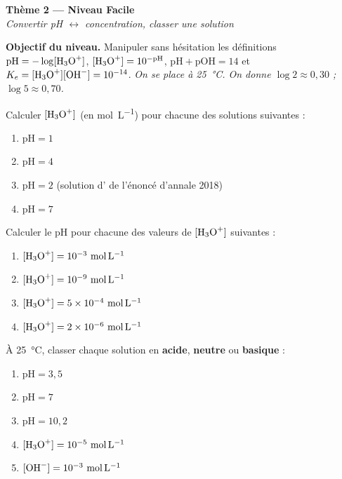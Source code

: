 \documentclass[11pt,a4paper]{article}
\begin{document}
\begin{center}
{\LARGE\bfseries\color{primarydark} Thème 2 --- Niveau Facile}\\[2pt]
{\color{primary}\itshape Convertir pH $\leftrightarrow$ concentration, classer une solution}
\end{center}

\begin{consigne}
\textbf{Objectif du niveau.} Manipuler sans hésitation les définitions $\mathrm{pH}=-\log[\ce{H3O+}]$,
$[\ce{H3O+}]=10^{-\mathrm{pH}}$, $\mathrm{pH}+\mathrm{pOH}=14$ et $K_e=[\ce{H3O+}][\ce{OH-}]=10^{-14}$.
\emph{On se place à \SI{25}{\celsius}. On donne $\log 2 \approx 0{,}30$ ; $\log 5 \approx 0{,}70$.}
\end{consigne}

\begin{exobox}
Calculer $[\ce{H3O+}]$ (en \si{mol.L^{-1}}) pour chacune des solutions suivantes :
\begin{enumerate}[label=\alph*),leftmargin=1.6em,itemsep=1pt]
  \item $\mathrm{pH} = 1$
  \item $\mathrm{pH} = 4$
  \item $\mathrm{pH} = 2$ (solution d' de l'énoncé d'annale 2018)
  \item $\mathrm{pH} = 7$
\end{enumerate}
\end{exobox}

\begin{exobox}
Calculer le $\mathrm{pH}$ pour chacune des valeurs de $[\ce{H3O+}]$ suivantes :
\begin{enumerate}[label=\alph*),leftmargin=1.6em,itemsep=1pt]
  \item $[\ce{H3O+}] = 10^{-3}\ \si{mol.L^{-1}}$
  \item $[\ce{H3O+}] = 10^{-9}\ \si{mol.L^{-1}}$
  \item $[\ce{H3O+}] = 5\times10^{-4}\ \si{mol.L^{-1}}$
  \item $[\ce{H3O+}] = 2\times10^{-6}\ \si{mol.L^{-1}}$
\end{enumerate}
\end{exobox}

\begin{exobox}
À \SI{25}{\celsius}, classer chaque solution en \textbf{acide}, \textbf{neutre} ou \textbf{basique} :
\begin{enumerate}[label=\alph*),leftmargin=1.6em,itemsep=1pt]
  \item $\mathrm{pH} = 3{,}5$
  \item $\mathrm{pH} = 7$
  \item $\mathrm{pH} = 10{,}2$
  \item $[\ce{H3O+}] = 10^{-5}\ \si{mol.L^{-1}}$
  \item $[\ce{OH-}] = 10^{-3}\ \si{mol.L^{-1}}$
\end{enumerate}
\end{exobox}
\end{document}
